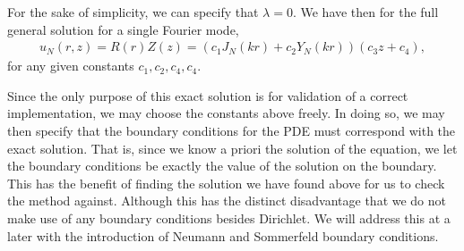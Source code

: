 For the sake of simplicity, we can specify that $\lambda=0$.
We have then for the full general solution for a single Fourier mode,
\begin{align}
	u_N(r,z) = R(r)Z(z) = \left( c_1 J_N \left( k r \right) + c_2 Y_N \left( k r \right) \right) \left( c_3 z + c_4 \right),
\end{align}
for any given constants $c_1,c_2,c_4,c_4$.

Since the only purpose of this exact solution is for validation of a correct implementation, we may choose the constants above freely.
In doing so, we may then specify that the boundary conditions for the PDE must correspond with the exact solution.
That is, since we know a priori the solution of the equation, we let the boundary conditions be exactly the value of the solution on the boundary.
This has the benefit of finding the solution we have found above for us to check the method against.
Although this has the distinct disadvantage that we do not make use of any boundary conditions besides Dirichlet.
We will address this at a later with the introduction of Neumann and Sommerfeld boundary conditions.
